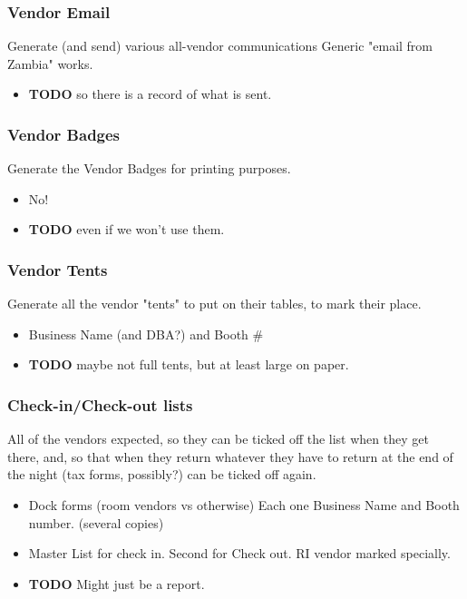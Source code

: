 \documentclass[captions=tablesignature]{scrartcl}
\begin{document}
\subsubsection{Vendor Email}
\label{sec-3-1-17}
Generate (and send) various all-vendor communications
Generic "email from Zambia" works.
\begin{itemize}
\item {\bfseries\sffamily TODO} so there is a record of what is sent.
\label{sec-3-1-17-1}
\end{itemize}

\subsubsection{Vendor Badges}
\label{sec-3-1-18}
Generate the Vendor Badges for printing purposes.
\begin{itemize}
\item No!
\end{itemize}
\begin{itemize}
\item {\bfseries\sffamily TODO} even if we won't use them.
\label{sec-3-1-18-1}
\end{itemize}

\subsubsection{Vendor Tents}
\label{sec-3-1-19}
Generate all the vendor "tents" to put on their tables, to mark
their place.
\begin{itemize}
\item Business Name (and DBA?) and Booth \#
\end{itemize}
\begin{itemize}
\item {\bfseries\sffamily TODO} maybe not full tents, but at least large on paper.
\label{sec-3-1-19-1}
\end{itemize}

\subsubsection{Check-in/Check-out lists}
\label{sec-3-1-20}
All of the vendors expected, so they can be ticked off the list
when they get there, and, so that when they return whatever they
have to return at the end of the night (tax forms, possibly?) can
be ticked off again.
\begin{itemize}
\item Dock forms (room vendors vs otherwise) Each one Business Name
and Booth number.  (several copies)
\item Master List for check in.  Second for Check out. RI vendor
marked specially.
\end{itemize}
\begin{itemize}
\item {\bfseries\sffamily TODO} Might just be a report.
\label{sec-3-1-20-1}
\end{itemize}
\end{document}
